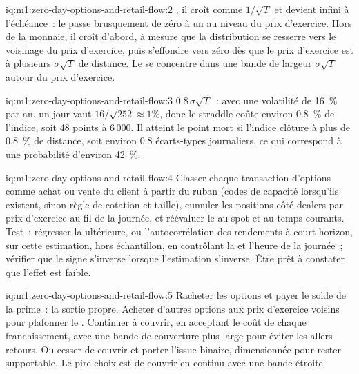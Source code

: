 \begin{solution}{iq:m1:zero-day-options-and-retail-flow:2}
, il croît comme $1/\sqrt T$ et devient infini à l'échéance~: le 
passe brusquement de zéro à un au niveau du prix d'exercice. Hors de la monnaie, il croît d'abord,
à mesure que la distribution se resserre vers le voisinage du prix d'exercice, puis
s'effondre vers zéro dès que le prix d'exercice est à plusieurs $\sigma\sqrt T$ de distance. Le 
se concentre dans une bande de largeur $\sigma\sqrt T$ autour du prix d'exercice.
\end{solution}

\begin{solution}{iq:m1:zero-day-options-and-retail-flow:3}
$0.8\,\sigma\sqrt T$~: avec une volatilité de 16~\% par an, un jour vaut $16/\sqrt{252} \approx 1\%$,
donc le straddle coûte environ 0.8~\% de l'indice, soit 48 points à 6\,000. Il atteint le point mort
si l'indice clôture à plus de 0.8~\% de distance, soit environ 0.8
écarts-types journaliers, ce qui correspond à une probabilité d'environ 42~\%.
\end{solution}

\begin{solution}{iq:m1:zero-day-options-and-retail-flow:4}
Classer chaque transaction d'options comme achat ou vente du client à partir du ruban (codes de capacité
lorsqu'ils existent, sinon règle de cotation et taille), cumuler les positions côté dealers par prix d'exercice
au fil de la journée, et réévaluer le  au spot et au temps courants. Test~:
régresser la  ultérieure, ou l'autocorrélation des rendements à court horizon,
sur cette estimation, hors échantillon, en contrôlant la  et l'heure de la journée~;
vérifier que le signe s'inverse lorsque l'estimation s'inverse. Être
prêt à constater que l'effet est faible.
\end{solution}

\begin{solution}{iq:m1:zero-day-options-and-retail-flow:5}
Racheter les options et payer le solde de la prime~: la sortie propre. Acheter
d'autres options aux prix d'exercice voisins pour plafonner le . Continuer à couvrir, en acceptant le
coût de chaque franchissement, avec une bande de couverture plus large pour éviter les allers-retours.
Ou cesser de couvrir et porter l'issue binaire, dimensionnée pour rester supportable. Le pire choix
est de couvrir en continu avec une bande étroite.
\end{solution}

